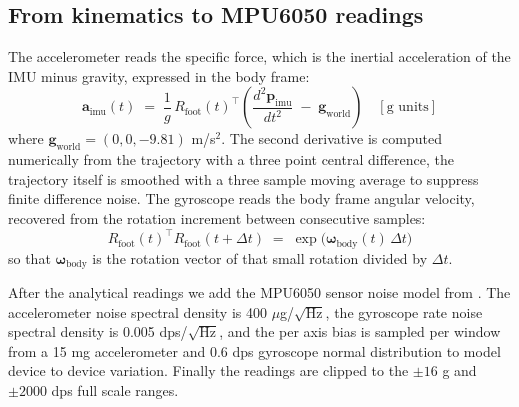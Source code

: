 \documentclass[conference]{IEEEtran}
\begin{document}
\subsection{From kinematics to MPU6050 readings}
The accelerometer reads the specific force, which is the inertial acceleration of the IMU minus gravity, expressed in the body frame:
\begin{equation}
  \mathbf{a}_\text{imu}(t) \;=\; \frac{1}{g}\,R_\text{foot}(t)^\top\!\left(\frac{d^2 \mathbf{p}_\text{imu}}{dt^2} \;-\; \mathbf{g}_\text{world}\right) \quad [\text{g units}]
\end{equation}
where $\mathbf{g}_\text{world} = (0,0,-9.81)$ m/s$^2$. The second derivative is computed numerically from the trajectory with a three point central difference, the trajectory itself is smoothed with a three sample moving average to suppress finite difference noise. The gyroscope reads the body frame angular velocity, recovered from the rotation increment between consecutive samples:
\begin{equation}
  R_\text{foot}(t)^\top R_\text{foot}(t + \Delta t) \;=\; \exp\!\big(\boldsymbol{\omega}_\text{body}(t)\,\Delta t\big)
\end{equation}
so that $\boldsymbol{\omega}_\text{body}$ is the rotation vector of that small rotation divided by $\Delta t$.

After the analytical readings we add the MPU6050 sensor noise model from \cite{invensense2013mpu6050}. The accelerometer noise spectral density is 400 $\mu$g/$\sqrt{\text{Hz}}$, the gyroscope rate noise spectral density is 0.005 dps/$\sqrt{\text{Hz}}$, and the per axis bias is sampled per window from a 15 mg accelerometer and 0.6 dps gyroscope normal distribution to model device to device variation. Finally the readings are clipped to the $\pm 16$ g and $\pm 2000$ dps full scale ranges.
\end{document}
